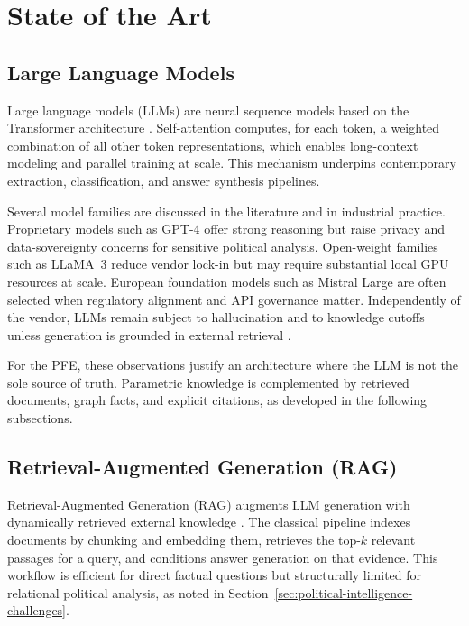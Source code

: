 \section{State of the Art}

\subsection{Large Language Models}

Large language models (LLMs) are neural sequence models based on the Transformer architecture \cite{vaswani-attention}. Self-attention computes, for each token, a weighted combination of all other token representations, which enables long-context modeling and parallel training at scale. This mechanism underpins contemporary extraction, classification, and answer synthesis pipelines.

Several model families are discussed in the literature and in industrial practice. Proprietary models such as GPT-4 offer strong reasoning but raise privacy and data-sovereignty concerns for sensitive political analysis. Open-weight families such as LLaMA~3 reduce vendor lock-in but may require substantial local GPU resources at scale. European foundation models such as Mistral Large are often selected when regulatory alignment and API governance matter. Independently of the vendor, LLMs remain subject to hallucination and to knowledge cutoffs unless generation is grounded in external retrieval \cite{lewis-rag}.

For the PFE, these observations justify an architecture where the LLM is not the sole source of truth. Parametric knowledge is complemented by retrieved documents, graph facts, and explicit citations, as developed in the following subsections.

\subsection{Retrieval-Augmented Generation (RAG)}

Retrieval-Augmented Generation (RAG) augments LLM generation with dynamically retrieved external knowledge \cite{lewis-rag}. The classical pipeline indexes documents by chunking and embedding them, retrieves the top-$k$ relevant passages for a query, and conditions answer generation on that evidence. This workflow is efficient for direct factual questions but structurally limited for relational political analysis, as noted in Section~\ref{sec:political-intelligence-challenges}.

